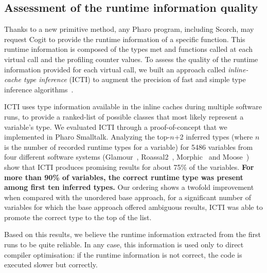 \documentclass[a4paper,12pt,twoside]{../includes/ThesisStyle}
\begin{document}
\subsection{Assessment of the runtime information quality}

Thanks to a new primitive method, any Pharo program, including Scorch, may request Cogit to provide the runtime information of a specific function. This runtime information is composed of the types met and functions called at each virtual call and the profiling counter values. To assess the quality of the runtime information provided for each virtual call, we built an approach called \emph{inline-cache type inference} (ICTI) to augment the precision of fast and simple type inference algorithms~\cite{Milo16a}. 

ICTI uses type information available in the inline caches during multiple software runs, to provide a ranked-list of possible classes that most likely represent a variable's type. We evaluated ICTI through a proof-of-concept that we implemented in Pharo Smalltalk. Analyzing the top-$n$+2 inferred types (where $n$ is the number of recorded runtime types for a variable) for 5486 variables from four different software systems (Glamour~\cite{Bung09a}, Roassal2~\cite{Pena13a}, Morphic~\cite{Fern07y} and Moose~\cite{Girb10a, Duca05a, Duca00b}) show that ICTI produces promising results for about 75\% of the variables. \textbf{For more than 90\% of variables, the correct runtime type was present among first ten inferred types.} Our ordering shows a twofold improvement when compared with the unordered base approach, \ie for a significant number of variables for which the base approach offered ambiguous results, ICTI was able to promote the correct type to the top of the list.

Based on this results, we believe the runtime information extracted from the first runs to be quite reliable. In any case, this information is used only to direct compiler optimisation: if the runtime information is not correct, the code is executed slower but correctly.

\ifx\wholebook\relax\else
    
\end{document}
